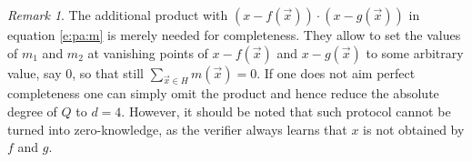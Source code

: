 \documentclass[11pt]{article}
\theoremstyle{definition}
\theoremstyle{remark}
\newtheorem{rem}[thm]{Remark}
\begin{document}
\begin{rem}
\label{rem:PAcompleteness}
The additional product  with $(x - f(\vec x))\cdot(x - g(\vec x))$ in equation \eqref{e:pa:m} is merely needed for completeness.
They allow to set the values of $m_1$ and $m_2$ at vanishing points of $x - f(\vec x)$ and $x - g(\vec x)$ to some arbitrary value, say $0$, so that still $\sum_{\vec x\in H} m(\vec x) = 0$.
If one does not aim perfect completeness one can simply omit the product and hence reduce the absolute degree of $Q$ to $d=4$.
However, it should be noted that such protocol cannot be turned into zero-knowledge, as the verifier always learns that $x$ is not obtained by $f$ and $g$.
\end{rem}



\end{document}
